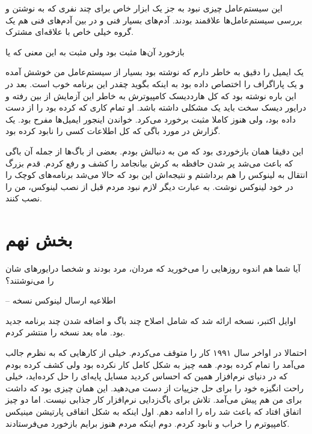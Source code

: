 این سیستم‌عامل چیزی نبود به جز یک ابزار خاص برای چند نفری که به نوشتن و
بررسی سیستم‌عامل‌ها علاقمند بودند. آدم‌های بسیار فنی و در بین آدم‌های فنی
هم یک گروه خیلی خاص با علاقه‌ای مشترک.

باز‌خورد آن‌ها مثبت بود ولی مثبت به این معنی که  یا 

یک ایمیل را دقیق به خاطر دارم که نوشته بود بسیار از سیستم‌عامل من خوشش
آمده و یک پاراگراف را اختصاص داده بود به اینکه بگوید چقدر این برنامه
خوب است. بعد در این باره نوشته بود که کل هارددیسک کامپیوترش به خاطر
این آزمایش از بین رفته و درایور دیسک سخت باید یک مشکلی داشته باشد. او
تمام کاری که کرده بود را از دست داده بود، ولی هنوز کاملا مثبت برخورد
می‌کرد. خواندن اینجور ایمیل‌ها مفرح بود. یک گزارش در مورد باگی که کل
اطلاعات کسی را نابود کرده بود.

این دقیقا همان باز‌خوردی بود که من به دنبالش بودم. بعضی از باگ‌ها از
جمله آن باگی که باعث می‌شد پر شدن حافظه به کرش بیانجامد را کشف و رفع
کردم. قدم بزرگ انتقال  به لینوکس را هم برداشتم و نتیجه‌اش این
بود که حالا می‌شد برنامه‌های کوچک را در خود لینوکس نوشت. به عبارت دیگر
لازم نبود مردم قبل از نصب لینوکس،  من را نصب کنند.

\section{بخش نهم}
\noindent آیا شما هم اندوه روزهایی را می‌خورید که مردان، مرد بودند و
شخصا درایورهای شان را می‌نوشتند؟

\hfill -- اطلاعیه ارسال لینوکس نسخه 

\vspace*{10pt}

اوایل اکتبر، نسخه  ارائه شد که شامل اصلاح چند باگ و اضافه
شدن چند برنامه‌ جدید بود. ماه بعد نسخه  را منتشر کردم.

احتمالا در اواخر سال ۱۹۹۱ کار را متوقف می‌کردم. خیلی از کارهایی که به
نظرم جالب می‌آمد را تمام کرده بودم. همه چیز به شکل کامل کار نکرده بود
ولی کشف کرده بودم که در دنیای نرم‌افزار همین که احساس کردید مسایل
پایه‌ای را حل کرده‌اید، خیلی راحت انگیزه خود را برای حل جزییات از دست
می‌دهید. این همان چیزی بود که داشت برای من هم پیش می‌آمد. تلاش برای
باگ‌زدایی نرم‌افزار کار جذابی نیست. اما دو چیز اتفاق افتاد که باعث شد
راه را ادامه دهم. اول اینکه به شکل اتفاقی پارتیشن مینیکس کامپیوترم را
خراب و نابود کردم. دوم اینکه مردم هنوز برایم بازخورد می‌فرستادند.

